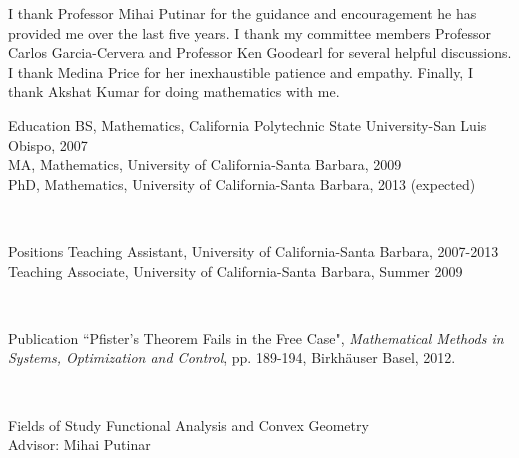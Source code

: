 \documentclass[12pt,oneside,final]{ucthesisucsbmath2010}
\newcommand{\R}{\mathbb{R}}
\newcommand{\p}{\mathcal{P}}
\newcommand{\pnd}{\R[x_1,\ldots,x_n]_{2d}}
\newcommand{\pn}{\R[x_1,\ldots,x_n]}
\theoremstyle{definition}
\begin{document}
\begin{frontmatter}
\approvalpage
\copyrightpage


\begin{acknowledgements}
I thank Professor Mihai Putinar for the guidance and encouragement he has provided me over the last five years. I thank my committee members Professor Carlos Garcia-Cervera and Professor Ken Goodearl for several helpful discussions. I thank Medina Price for her inexhaustible patience and empathy. Finally, I thank Akshat Kumar for doing mathematics with me.
\end{acknowledgements}

\begin{vitae}
\begin{vitaesection}{Education}
BS, Mathematics, California Polytechnic State University-San Luis Obispo, 2007\\
MA, Mathematics, University of California-Santa Barbara, 2009\\
PhD, Mathematics, University of California-Santa Barbara, 2013 (expected)
\end{vitaesection}\
\begin{vitaesection}{Positions}
Teaching Assistant, University of California-Santa Barbara, 2007-2013\\
Teaching Associate, University of California-Santa Barbara, Summer 2009
\end{vitaesection}\
\begin{vitaesection}{Publication}
``Pfister's Theorem Fails in the Free Case", \emph{Mathematical Methods in Systems, Optimization and Control}, pp. 189-194, Birkh\"{a}user Basel, 2012.
\end{vitaesection}\
\begin{vitaesection}{Fields of Study}
Functional Analysis and Convex Geometry\\
Advisor: Mihai Putinar
\end{vitaesection}

\end{vitae}

\begin{abstract}
The \emph{length} of a sum of squares $\sigma$ in a ring $R$ is the smallest natural $k$ such that $\sigma$ can be realized as a sum of $k$ squares in $R$. For a set $S\subseteq R$, the \emph{pythagoras number} of $S$, denoted by $\p(S)$, is the maximum value of length over all $\sigma \in S$. This dissertation is motivated by the following simple question: if $R=\pn$ and $S=\pnd$ (the span of forms of degree $2d$), then what is $\p(S)$?


\end{abstract}
\end{frontmatter}
\end{document}
